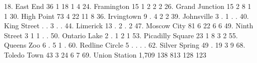         18. East End {\VBAR}         36           1          18           1           4
      24. Framington {\VBAR}         15           1           2           2           2
  26. Grand Junction {\VBAR}         15           2           8           1           1
      30. High Point {\VBAR}         73           4          22          11           8
      36. Irvingtown {\VBAR}          9           .           4           2           2
      39. Johnsville {\VBAR}          3           .           1           .           .
     40. King Street {\VBAR}          .           .           3           .           .
        44. Limerick {\VBAR}         13           .           2           .           2
     47. Moscow City {\VBAR}         81           6          22           6           6
    49. Ninth Street {\VBAR}          3           1           1           .           .
    50. Ontario Lake {\VBAR}          2           .           1           2           1
53. Picadilly Square {\VBAR}         23           1           8           3           2
      55. Queens Zoo {\VBAR}          6           .           5           1           .
  60. Redline Circle {\VBAR}          5           .           .           .           .
   62. Silver Spring {\VBAR}         49           .          19           3           9
     68. Toledo Town {\VBAR}         43           3          24           6           7
   69. Union Station {\VBAR}      1,709         138         813         128         123
